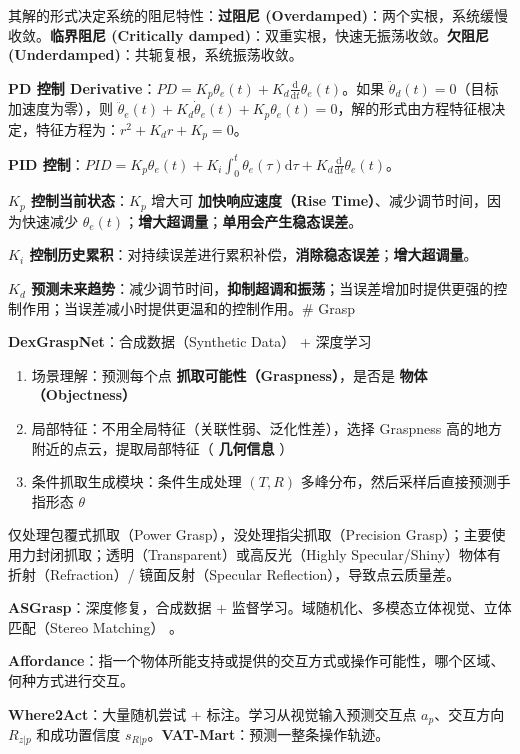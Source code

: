\documentclass[
  8pt]{extarticle}
\providecommand{\tightlist}{%
  \setlength{\itemsep}{0pt}\setlength{\parskip}{0pt}}
\begin{document}
\begin{multicols*}{4}
其解的形式决定系统的阻尼特性：\textbf{过阻尼
(Overdamped)}：两个实根，系统缓慢收敛。\textbf{临界阻尼 (Critically
damped)}：双重实根，快速无振荡收敛。\textbf{欠阻尼
(Underdamped)}：共轭复根，系统振荡收敛。

\textbf{PD 控制
Derivative}：\(PD = K_p \theta_e(t) + K_d \frac{\mathrm{d}}{\mathrm{d}t}\theta_e(t)\)。如果
\(\ddot{\theta}_d(t) = 0\)（目标加速度为零），则
\(\ddot{\theta}_e(t) + K_d \dot{\theta}_e(t) + K_p \theta_e(t) = 0\)，解的形式由方程特征根决定，特征方程为：\(r^2 + K_d r + K_p = 0\)。

\textbf{PID
控制}：\(PID = K_p \theta_e(t) + K_i \int_0^t \theta_e(\tau)\mathrm{d}\tau + K_d \frac{\mathrm{d}}{\mathrm{d}t}\theta_e(t)\)。

\textbf{\(K_p\) 控制当前状态}：\(K_p\) 增大可 \textbf{加快响应速度（Rise
Time）}、减少调节时间，因为快速减少
\(\theta_e(t)\)；\textbf{增大超调量}；\textbf{单用会产生稳态误差}。

\textbf{\(K_i\)
控制历史累积}：对持续误差进行累积补偿，\textbf{消除稳态误差}；\textbf{增大超调量}。

\textbf{\(K_d\)
预测未来趋势}：减少调节时间，\textbf{抑制超调和振荡}；当误差增加时提供更强的控制作用；当误差减小时提供更温和的控制作用。\#
Grasp

\textbf{DexGraspNet}：合成数据（Synthetic Data） + 深度学习

\begin{enumerate}
\def\labelenumi{\arabic{enumi}.}
\tightlist
\item
  场景理解：预测每个点 \textbf{抓取可能性（Graspness）}，是否是
  \textbf{物体（Objectness）}
\item
  局部特征：不用全局特征（关联性弱、泛化性差），选择 Graspness
  高的地方附近的点云，提取局部特征（ \textbf{几何信息} ）
\item
  条件抓取生成模块：条件生成处理 \((T, R)\)
  多峰分布，然后采样后直接预测手指形态 \(\theta\)
\end{enumerate}

仅处理包覆式抓取（Power Grasp），没处理指尖抓取（Precision
Grasp）；主要使用力封闭抓取；透明（Transparent）或高反光（Highly
Specular/Shiny）物体有折射（Refraction）/ 镜面反射（Specular
Reflection），导致点云质量差。

\textbf{ASGrasp}：深度修复，合成数据 +
监督学习。域随机化、多模态立体视觉、立体匹配（Stereo Matching） 。

\textbf{Affordance}：指一个物体所能支持或提供的交互方式或操作可能性，哪个区域、何种方式进行交互。

\textbf{Where2Act}：大量随机尝试 + 标注。学习从视觉输入预测交互点
\(a_p\)、交互方向 \(R_{z|p}\) 和成功置信度
\(s_{R|p}\)。\textbf{VAT-Mart}：预测一整条操作轨迹。


\end{multicols*}
\end{document}
